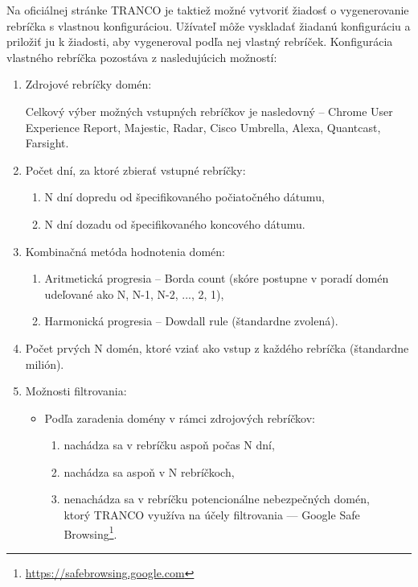 Na oficiálnej stránke TRANCO je taktiež možné vytvoriť žiadosť o vygenerovanie rebríčka s vlastnou konfiguráciou.
Užívateľ môže vyskladať žiadanú konfiguráciu a priložiť ju k žiadosti, aby vygeneroval podľa nej vlastný rebríček.
Konfigurácia vlastného rebríčka pozostáva z nasledujúcich možností: \cite{tranco-config}
\begin{enumerate}
    \item Zdrojové rebríčky domén:
    
    Celkový výber možných vstupných rebríčkov je nasledovný -- Chrome User Experience Report, Majestic, Radar, Cisco Umbrella, Alexa, Quantcast, Farsight.
    
    \item Počet dní, za ktoré zbierať vstupné rebríčky:
    \begin{enumerate}
        \item N dní dopredu od špecifikovaného počiatočného dátumu,
        \item N dní dozadu od špecifikovaného koncového dátumu.
    \end{enumerate}

    \item Kombinačná metóda hodnotenia domén:
    \begin{enumerate}
        \item Aritmetická progresia -- Borda count (skóre postupne v poradí domén udeľované ako N, N-1, N-2, ..., 2, 1),
        \item Harmonická progresia -- Dowdall rule (štandardne zvolená).
    \end{enumerate}

    \item Počet prvých N domén, ktoré vziať ako vstup z každého rebríčka (štandardne milión).

    \item Možnosti filtrovania:
    \begin{itemize}
        \item Podľa zaradenia domény v rámci zdrojových rebríčkov:
        \begin{enumerate}
            \item nachádza sa v rebríčku aspoň počas N dní,
            \item nachádza sa aspoň v N rebríčkoch,
            \item nenachádza sa v rebríčku potencionálne nebezpečných domén, \\ ktorý TRANCO využíva na účely filtrovania --- Google Safe Browsing\footnote{\href{https://safebrowsing.google.com}{https://safebrowsing.google.com}}.
        \end{enumerate}


\end{itemize}
\end{enumerate}
